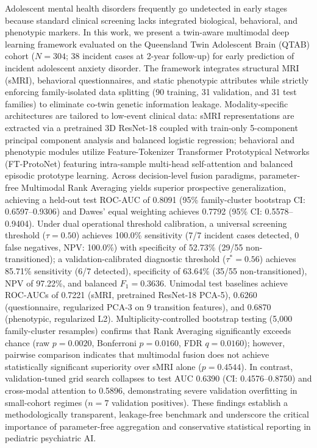 \documentclass[10pt,letterpaper]{article}
\begin{document}
Adolescent mental health disorders frequently go undetected in early stages because standard clinical screening lacks integrated biological, behavioral, and phenotypic markers. In this work, we present a twin-aware multimodal deep learning framework evaluated on the Queensland Twin Adolescent Brain (QTAB) cohort ($N=304$; 38 incident cases at 2-year follow-up) for early prediction of incident adolescent anxiety disorder. The framework integrates structural MRI (sMRI), behavioral questionnaires, and static phenotypic attributes while strictly enforcing family-isolated data splitting (90 training, 31 validation, and 31 test families) to eliminate co-twin genetic information leakage. Modality-specific architectures are tailored to low-event clinical data: sMRI representations are extracted via a pretrained 3D ResNet-18 coupled with train-only 5-component principal component analysis and balanced logistic regression; behavioral and phenotypic modules utilize Feature-Tokenizer Transformer Prototypical Networks (FT-ProtoNet) featuring intra-sample multi-head self-attention and balanced episodic prototype learning. Across decision-level fusion paradigms, parameter-free Multimodal Rank Averaging yields superior prospective generalization, achieving a held-out test ROC-AUC of 0.8091 (95\% family-cluster bootstrap CI: 0.6597--0.9306) and Dawes' equal weighting achieves 0.7792 (95\% CI: 0.5578--0.9404). Under dual operational threshold calibration, a universal screening threshold ($\tau = 0.50$) achieves 100.0\% sensitivity (7/7 incident cases detected, 0 false negatives, NPV: 100.0\%) with specificity of 52.73\% (29/55 non-transitioned); a validation-calibrated diagnostic threshold ($\tau^* = 0.56$) achieves 85.71\% sensitivity (6/7 detected), specificity of 63.64\% (35/55 non-transitioned), NPV of 97.22\%, and balanced $F_1 = 0.3636$. Unimodal test baselines achieve ROC-AUCs of 0.7221 (sMRI, pretrained ResNet-18 PCA-5), 0.6260 (questionnaire, regularized PCA-3 on 9 transition features), and 0.6870 (phenotypic, regularized L2). Multiplicity-controlled bootstrap testing (5,000 family-cluster resamples) confirms that Rank Averaging significantly exceeds chance (raw $p = 0.0020$, Bonferroni $p = 0.0160$, FDR $q = 0.0160$); however, pairwise comparison indicates that multimodal fusion does not achieve statistically significant superiority over sMRI alone ($p = 0.4544$). In contrast, validation-tuned grid search collapses to test AUC 0.6390 (CI: 0.4576--0.8750) and cross-modal attention to 0.5896, demonstrating severe validation overfitting in small-cohort regimes ($n=7$ validation positives). These findings establish a methodologically transparent, leakage-free benchmark and underscore the critical importance of parameter-free aggregation and conservative statistical reporting in pediatric psychiatric AI.
\end{document}

